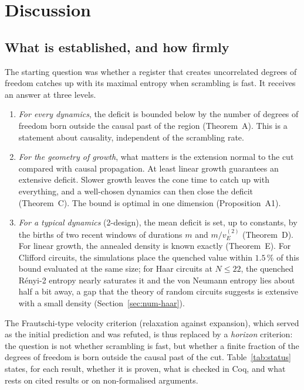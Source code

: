 \section{Discussion}\label{sec:discussion}

\subsection{What is established, and how firmly}

The starting question was whether a register that creates uncorrelated degrees of freedom catches up with its maximal entropy when scrambling is fast. It receives an answer at three levels.
\begin{enumerate}[leftmargin=*,itemsep=2pt]
\item \emph{For every dynamics}, the deficit is bounded below by the number of degrees of freedom born outside the causal past of the region (Theorem~A). This is a statement about causality, independent of the scrambling rate.
\item \emph{For the geometry of growth}, what matters is the extension normal to the cut compared with causal propagation. At least linear growth guarantees an extensive deficit. Slower growth leaves the cone time to catch up with everything, and a well-chosen dynamics can then close the deficit (Theorem~C). The bound is optimal in one dimension (Proposition~A1).
\item \emph{For a typical dynamics} (2-design), the mean deficit is set, up to constants, by the births of two recent windows of durations $m$ and $m/v_E^{(2)}$ (Theorem~D). For linear growth, the annealed density is known exactly (Theorem~E). For Clifford circuits, the simulations place the quenched value within $1.5\,\%$ of this bound evaluated at the same size; for Haar circuits at $N\le22$, the quenched R\'enyi-2 entropy nearly saturates it and the von Neumann entropy lies about half a bit away, a gap that the theory of random circuits suggests is extensive with a small density (Section~\ref{sec:num-haar}).
\end{enumerate}
The Frautschi-type velocity criterion (relaxation against expansion), which served as the initial prediction and was refuted, is thus replaced by a \emph{horizon} criterion: the question is not whether scrambling is fast, but whether a finite fraction of the degrees of freedom is born outside the causal past of the cut. Table~\ref{tab:status} states, for each result, whether it is proven, what is checked in Coq, and what rests on cited results or on non-formalised arguments.

